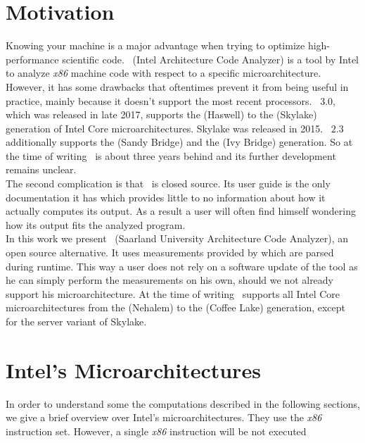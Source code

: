 
\section{Motivation}

Knowing your machine is a major advantage when trying to optimize high-performance scientific code. \iaca\ (Intel Architecture Code Analyzer) \cite{iaca} is a tool by Intel to analyze \emph{x86} machine code with respect to a specific microarchitecture. However, it has some drawbacks that oftentimes prevent it from being useful in practice, mainly because it doesn't support the most recent processors. \iaca\ $3.0$, which was released in late 2017, supports the  (Haswell) to the  (Skylake) generation of Intel Core microarchitectures. Skylake was released in 2015. \iaca\ $2.3$ additionally supports the  (Sandy Bridge) and the  (Ivy Bridge) generation. So at the time of writing \iaca\ is about three years behind and its further development remains unclear.\\
The second complication is that \iaca\ is closed source. Its user guide \cite{userguide} is the only documentation it has which provides little to no information about how it actually computes its output. As a result a user will often find himself wondering how its output fits the analyzed program.\\
In this work we present \suaca\ (Saarland University Architecture Code Analyzer), an open source alternative. It uses measurements provided by \cite{Andreas} which are parsed during runtime. This way a user does not rely on a software update of the tool as he can simply perform the measurements on his own, should we not already support his microarchitecture. At the time of writing \suaca\ supports all Intel Core microarchitectures from the  (Nehalem) to the  (Coffee Lake) generation, except for the server variant of Skylake.
\newpage

\section{Intel's Microarchitectures}


In order to understand some the computations described in the following sections, we give a brief overview over Intel's microarchitectures. They use the \emph{x86} instruction set. However, a single \emph{x86} instruction will be not executed



